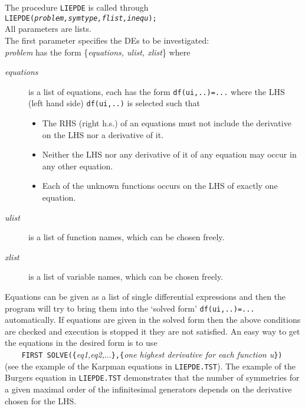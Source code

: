 The procedure \texttt{LIEPDE} is called through \\
\texttt{LIEPDE(\textit{problem,symtype,flist,inequ}); } \\
All parameters are lists.  \\[6pt]
The first parameter specifies the DEs to be investigated: \\
\textit{problem} has the form \{\textit{equations, ulist, xlist}\} where
\begin{description}
\item[\textit{equations}] is a list of equations, each has the form
  \texttt{df(ui,..)=...} where the LHS (left hand side)
  \texttt{df(ui,..)} is selected such that
  \begin{itemize}
  \item The RHS (right h.s.) of an equations must not include the
    derivative on the LHS nor a derivative of it.
  \item Neither the LHS nor any derivative of it of any equation may
    occur in any other equation.
  \item Each of the unknown functions occurs on the LHS of exactly one
    equation.
  \end{itemize}
\item[\textit{ulist}] is a list of function names, which can be chosen freely.
\item[\textit{xlist}] is a list of variable names, which can be chosen freely.
\end{description}
Equations can be given as a list of single differential expressions and then
the program will try to bring them into the `solved form' \texttt{df(ui,..)=...}
automatically. If equations are given in the solved form then the above
conditions are checked and execution is stopped it they are not satisfied.
An easy way to get the equations in the desired form is to use \\
\verb+    FIRST SOLVE({+\textit{eq1,eq2,}...\verb+},{+\textit{one highest
derivative for each function u}\verb+})+  \\
(see the example of the Karpman equations in \texttt{LIEPDE.TST}). 
The example of the Burgers equation in \texttt{LIEPDE.TST} demonstrates 
that the number of symmetries for a given maximal order of the infinitesimal
generators depends on the derivative chosen for the LHS.


